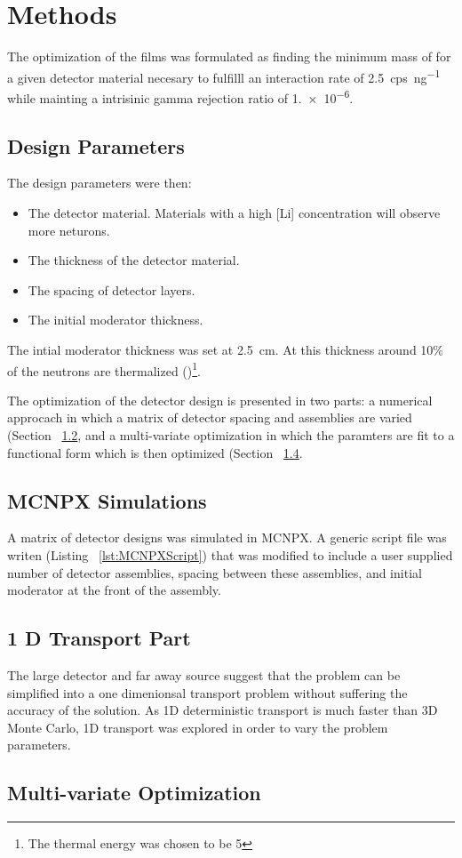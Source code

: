 \section{Methods}
\label{sec:Methodes}


The optimization of the films was formulated as finding the minimum mass of  for a given detector material necesary to fulfilll an interaction rate of \SI{2.5}{cps\per\nano\gram{}} while mainting a intrisinic gamma rejection ratio of \num{1.e-6}.

\subsection{Design Parameters}
\label{sec:DesignParameters}
The design parameters were then:
\begin{itemize}
  \item The detector material. Materials with a high [Li] concentration will observe more neturons.
  \item The thickness of the detector material.
  \item The spacing of detector layers.
  \item The initial moderator thickness.
\end{itemize}

The intial moderator thickness was set at \SI{2.5}{\centi \meter}.
At this thickness around 10\% of the neutrons are thermalized ()\footnote{The thermal energy was chosen to be \SI{5}{\ev}}.

The optimization of the detector design is presented in two parts: a numerical approcach in which a matrix of detector spacing and assemblies are varied (Section ~\ref{sec:MCNPXMethods}, and a multi-variate optimization in which the paramters are fit to a functional form which is then optimized (Section ~\ref{sec:MVOptimization}.
\subsection{MCNPX Simulations}
\label{sec:MCNPXMethods}
A matrix of detector designs was simulated in MCNPX.
A generic script file was writen (Listing ~\ref{lst:MCNPXScript}) that was modified to include a user supplied number of detector assemblies, spacing between these assemblies, and initial moderator at the front of the assembly.


\subsection{1 D Transport Part}
The large detector and far away source suggest that the problem can be simplified into a one dimenionsal transport problem without suffering the accuracy of the solution.
As 1D deterministic transport is much faster than 3D Monte Carlo, 1D transport was explored in order to vary the problem parameters.

\subsection{Multi-variate Optimization}
\label{sec:MVOptimization}
